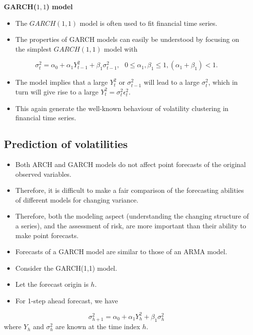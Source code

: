 \documentclass[]{book}
\providecommand{\tightlist}{%
  \setlength{\itemsep}{0pt}\setlength{\parskip}{0pt}}
\begin{document}
\textbf{GARCH(\(1,1\)) model}

\begin{itemize}
\tightlist
\item
  The \(GARCH(1,1)\) model is often used to fit financial time series.
\item
  The properties of GARCH models can easily be understood by focusing
  on the simplest \(GARCH(1,1)\) model with
\end{itemize}

\[\sigma_t^2 = \alpha_0+\alpha_1Y_{t-1}^2 + \beta_1\sigma_{t-1}^2, \text{  } 0\leq\alpha_1, \beta_1\leq 1, (\alpha_1+\beta_1)<1.\]

\begin{itemize}
\tightlist
\item
  The model implies that a large \(Y_t^2\) or \(\sigma_{t-1}^2\) will lead to a large \(\sigma_{t}^2\), which in turn will give rise to a large \(Y_t^2=\sigma_t^2\epsilon_t^2.\)
\item
  This again generate the well-known behaviour of volatility clustering in financial time series.
\end{itemize}

\hypertarget{prediction-of-volatilities}{%
\subsection{Prediction of volatilities}\label{prediction-of-volatilities}}

\begin{itemize}
\tightlist
\item
  Both ARCH and GARCH models do not affect point forecasts of the original observed variables.
\item
  Therefore, it is difficult to make a fair comparison of the forecasting abilities of different models for changing variance.
\item
  Therefore, both the modeling aspect (understanding the changing structure of a series), and the assessment of risk, are more important than their ability to make point forecasts.
\item
  Forecasts of a GARCH model are similar to those of an ARMA model.
\item
  Consider the GARCH(1,1) model.
\item
  Let the forecast origin is \(h\).
\item
  For 1-step ahead forecast, we have
\end{itemize}

\[\sigma_{h+1}^2 = \alpha_0+\alpha_1Y_h^2+\beta_1\sigma_h^2\]
where \(Y_h\) and \(\sigma_h^2\) are known at the time index \(h\).
\end{document}

